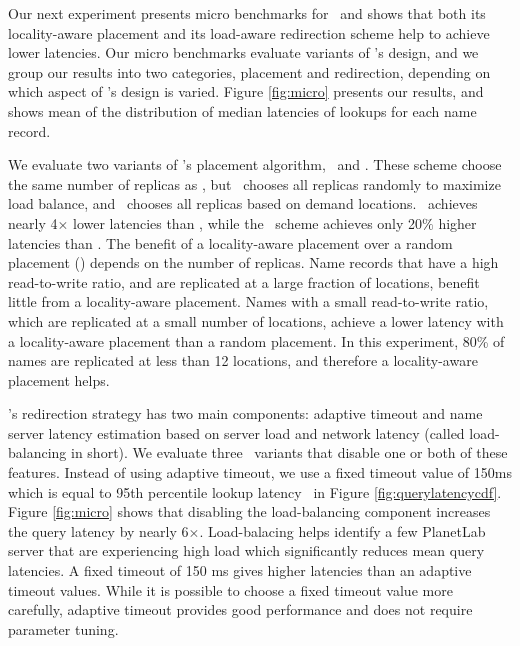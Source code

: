Our next experiment presents micro benchmarks for \auspice\ and shows that both its locality-aware placement and its load-aware redirection scheme help to achieve lower latencies. Our micro benchmarks evaluate variants of \auspice's design, and we group our results into two categories, placement and redirection, depending on which aspect of \auspice's design is varied. Figure \ref{fig:micro}  presents our results, and shows mean of the distribution of median latencies of lookups for each name record.

We evaluate two variants of \auspice's placement algorithm, \uniform\ and \locaware. These scheme choose the same number of replicas as \auspice, but \uniform\ chooses all replicas randomly to maximize load balance, and  \locaware\ chooses all replicas based on demand locations.  \auspice\ achieves nearly 4$\times$ lower latencies than \uniform, while the \locaware\ scheme achieves only 20$\%$ higher latencies than \auspice. 
The benefit of a locality-aware placement over a random placement (\uniform) depends on the number of replicas. 
Name records that have a high read-to-write ratio, and are replicated at a large fraction of locations, benefit little from a locality-aware placement. 
Names with a small read-to-write ratio, which are replicated at a small number of locations, achieve a lower latency with a locality-aware placement than a random placement.  In this experiment,  80\% of names are replicated at less than 12 locations, and therefore a locality-aware placement helps. 



\auspice's redirection strategy has two main components: adaptive timeout and name server latency estimation based on server load and network latency (called load-balancing in short). We evaluate three \auspice\ variants that disable one or both of these features. Instead of using adaptive timeout, we use a fixed timeout value of 150ms which is equal to 95th percentile lookup latency \auspice\ in Figure \ref{fig:querylatencycdf}. Figure \ref{fig:micro} shows that disabling the load-balancing component increases the query latency by nearly 6$\times$. Load-balacing helps identify a few PlanetLab server that are experiencing high load which significantly reduces mean query latencies. A fixed timeout of 150 ms gives higher latencies than an adaptive timeout values. While it is possible to choose a fixed timeout value more carefully, adaptive timeout provides good performance and does not require parameter tuning.








